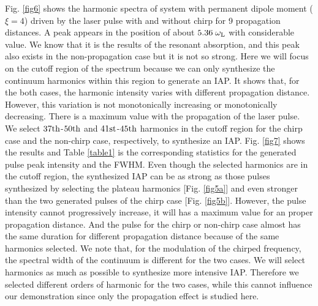 \documentclass[10pt,letterpaper]{article}
\begin{document}
Fig. \ref{fig6} shows the harmonic spectra of system with permanent dipole moment ($ \xi=4 $) driven by the laser pulse with and without chirp for 9 propagation distances. A peak appears in the position of about  $ 5.36\;\omega_{\rm{L}} $ with considerable value. We know that it is the results of the resonant absorption, and this peak also exists in the non-propagation case but it is not so strong. Here we will focus on the cutoff region of the spectrum because we can only synthesize the continuum harmonics within this region to generate an IAP. It shows that, for the both cases, the harmonic intensity varies with different propagation distance. However, this variation is not monotonically increasing or monotonically decreasing. There is a maximum value with the propagation of the laser pulse. We select $37\rm{th}$-$50\rm{th}$ and $41\rm{st}$-$45\rm{th}$ harmonics in the cutoff region for the chirp case and the non-chirp case, respectively, to synthesize an IAP. Fig. \ref{fig7} shows the results and Table \ref{table1} is the corresponding statistics for the generated pulse peak intensity and the FWHM. Even though the selected harmonics are in the cutoff region, the synthesized IAP can be as strong as those pulses synthesized by selecting the plateau harmonics [Fig. \ref{fig5a}] and even stronger than the two generated pulses of the chirp case [Fig. \ref{fig5b}]. However, the pulse intensity cannot progressively increase, it will has a maximum value for an proper propagation distance. And the pulse for the chirp or non-chirp case almost has the same duration for different propagation distance because of the same harmonics selected. We note that, for the modulation of the chirped frequency, the spectral width of the continuum is different for the two cases. We will select harmonics as much as possible to synthesize more intensive IAP. Therefore we selected different orders of harmonic for the two cases, while this cannot influence our demonstration  since only the propagation effect is studied here.
\end{document}
